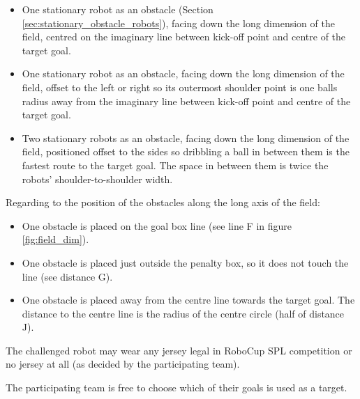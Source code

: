 \begin{itemize}
	\item One stationary robot as an obstacle (\cf Section \ref{sec:stationary_obstacle_robots}), facing down the long dimension of the field, centred on the imaginary line between kick-off point and centre of the target goal.
	\item One stationary robot as an obstacle, facing down the long dimension of the field, offset to the left or right so its outermost shoulder point is one balls radius away from the imaginary line between kick-off point and centre of the target goal. %
	\item Two stationary robots as an obstacle, facing down the long dimension of the field, positioned offset to the sides so dribbling a ball in between them is the fastest route to the target goal. The space in between them is twice the robots' shoulder-to-shoulder width. %
\end{itemize}

Regarding to the position of the obstacles along the long axis of the field:

\begin{itemize}
	\item One obstacle is placed on the goal box line (see line F in figure \ref{fig:field_dim}).
	\item One obstacle is placed just outside the penalty box, so it does not touch the line (see distance  G).
	\item One obstacle is placed away from the centre line towards the target goal. The distance to the centre line is the radius of the centre circle (half of distance J).
\end{itemize}

The challenged robot may wear any jersey legal in RoboCup SPL competition or no jersey at all (as decided by the participating team).

The participating team is free to choose which of their goals is used as a target.

